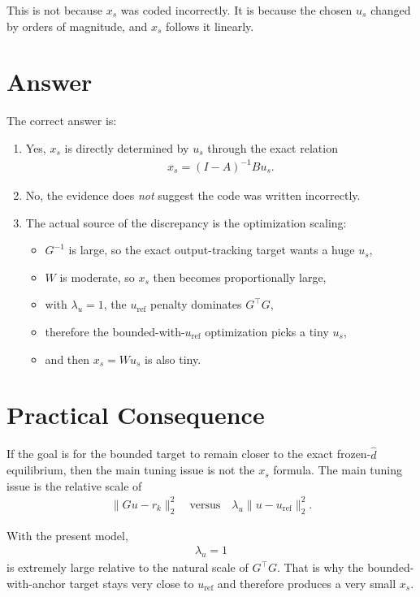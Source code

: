 \documentclass[11pt]{article}
\begin{document}
This is not because \(x_s\) was coded incorrectly. It is because the chosen \(u_s\) changed by orders of magnitude, and \(x_s\) follows it linearly.

\section{Answer}

The correct answer is:
\begin{enumerate}
\item Yes, \(x_s\) is directly determined by \(u_s\) through the exact relation
\begin{align}
x_s = (I-A)^{-1}Bu_s.
\end{align}
\item No, the evidence does \emph{not} suggest the code was written incorrectly.
\item The actual source of the discrepancy is the optimization scaling:
\begin{itemize}
\item \(G^{-1}\) is large, so the exact output-tracking target wants a huge \(u_s\),
\item \(W\) is moderate, so \(x_s\) then becomes proportionally large,
\item with \(\lambda_u = 1\), the \(u_{\mathrm{ref}}\) penalty dominates \(G^\top G\),
\item therefore the bounded-with-\(u_{\mathrm{ref}}\) optimization picks a tiny \(u_s\),
\item and then \(x_s = Wu_s\) is also tiny.
\end{itemize}
\end{enumerate}

\section{Practical Consequence}

If the goal is for the bounded target to remain closer to the exact frozen-$\hat d$ equilibrium, then the main tuning issue is not the \(x_s\) formula. The main tuning issue is the relative scale of
\begin{align}
\|Gu-r_k\|_2^2
\quad\text{versus}\quad
\lambda_u \|u-u_{\mathrm{ref}}\|_2^2.
\end{align}

With the present model,
\begin{align}
\lambda_u = 1
\end{align}
is extremely large relative to the natural scale of \(G^\top G\). That is why the bounded-with-anchor target stays very close to \(u_{\mathrm{ref}}\) and therefore produces a very small \(x_s\).
\end{document}
